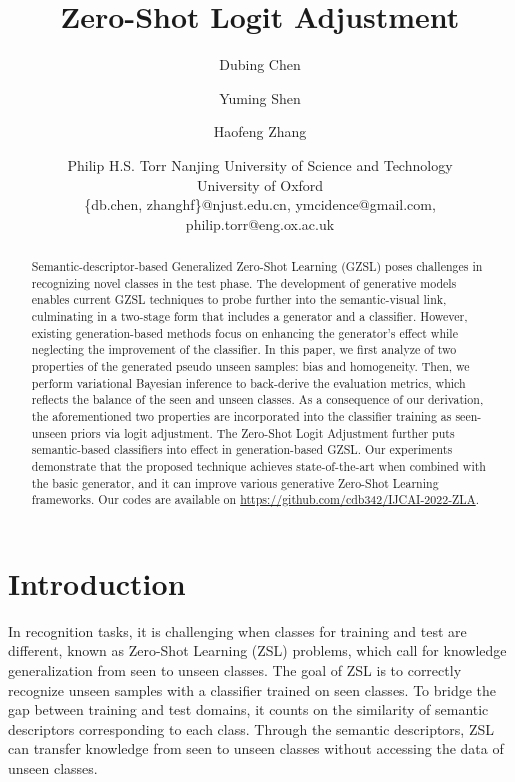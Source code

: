 \documentclass{article}
\title{Zero-Shot Logit Adjustment}
\author{
	Dubing Chen
	\and
	Yuming Shen\and
	Haofeng Zhang\textsuperscript{\Letter}\and
	Philip H.S. Torr
	\affiliations
	Nanjing University of Science and Technology\\
	University of Oxford\\
	\emails
	\{db.chen, zhanghf\}@njust.edu.cn,
	ymcidence@gmail.com,
	philip.torr@eng.ox.ac.uk
}
\begin{document}
	\maketitle
	
	\begin{abstract}
		Semantic-descriptor-based Generalized Zero-Shot Learning (GZSL) poses challenges in recognizing novel classes in the test phase. The development of generative models enables current GZSL techniques to probe further into the semantic-visual link, culminating in a two-stage form that includes a generator and a classifier. However, existing generation-based methods focus on enhancing the generator's effect while neglecting the improvement of the classifier. In this paper, we first analyze of two properties of the generated pseudo unseen samples: bias and homogeneity. Then, we perform variational Bayesian inference to back-derive the evaluation metrics, which reflects the balance of the seen and unseen classes. As a consequence of our derivation, the aforementioned two properties are incorporated into the classifier training as seen-unseen priors via logit adjustment. The Zero-Shot Logit Adjustment further puts semantic-based classifiers into effect in generation-based GZSL. Our experiments demonstrate that the proposed technique achieves state-of-the-art when combined with the basic generator, and it can improve various generative Zero-Shot Learning frameworks. Our codes are available on \url{https://github.com/cdb342/IJCAI-2022-ZLA}.
	\end{abstract}
		\section{Introduction}

	In recognition tasks, it is challenging when classes for training and test are different, known as Zero-Shot Learning (ZSL) problems, which call for knowledge generalization from seen to unseen classes. The goal of ZSL is to correctly recognize unseen samples with a classifier trained on seen classes. To bridge the gap between training and test domains, it counts on the similarity of semantic descriptors \cite{lampert2009learning} corresponding to each class.\let\thefootnote\relax{} 
        \let\thefootnote\relax{}Through the semantic descriptors, ZSL can transfer knowledge from seen to unseen classes without accessing the data of unseen classes.
\end{document}
